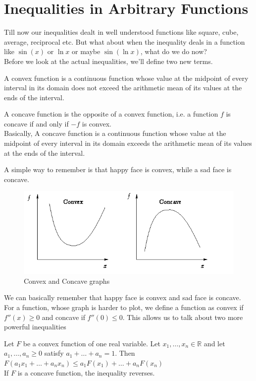 \section{Inequalities in Arbitrary Functions}
Till now our inequalities dealt in well understood functions like square, cube, average, reciprocal etc. But what about when the inequality deals in a function like $\sin(x)$ or $\ln{x}$ or maybe $\sin(\ln{x})$, what do we do now?\\
Before we look at the actual inequalities, we'll define two new terms.\\
\begin{definition}
   A convex function is a continuous function whose value at the midpoint of every interval in its domain does not exceed the arithmetic mean of its values at the ends of the interval.
\end{definition}
\begin{definition}
    A concave function is the opposite of a convex function, i.e. a function $f$ is concave if and only if $-f$  is convex.\\
    Basically, A concave function is a continuous function whose value at the midpoint of every interval in its domain exceeds the arithmetic mean of its values at the ends of the interval.
\end{definition}
A simple way to remember is that happy face is convex, while a sad face is concave. \begin{figure}[h]
    \centering
    \includegraphics[width=0.75\linewidth]{Photos/convex, concave.png}
    \caption{Convex and Concave graphs}
\end{figure}
We can basically remember that happy face is convex and sad face is concave.\\
For a function, whose graph is harder to plot, we define a function as convex if  $f''(x)\geq 0$ and concave if $f''(0) \leq 0$. This allows us to talk about two more powerful inequalities\\
\begin{theorem}
Let ${F}$ be a convex function of one real variable. Let $x_1,\dots,x_n\in\mathbb R$ and let $a_1,\dots, a_n\ge 0$ satisfy $a_1+\dots+a_n=1$. Then\\
$F(a_1x_1+\dots+a_n x_n)\le a_1F(x_1)+\dots+a_n F(x_n)$\\
If ${F}$ is a concave function, the inequality reverses.
\end{theorem}
